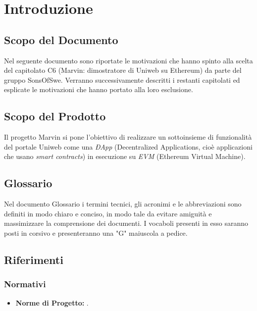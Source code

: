 \section{Introduzione}
\subsection{Scopo del Documento}
	Nel seguente documento sono riportate le motivazioni che hanno spinto alla scelta del capitolato C6 (Marvin: dimostratore di Uniweb su Ethereum) da parte del gruppo SonsOfSwe. Verranno successivamente descritti i restanti capitolati ed esplicate le motivazioni che hanno portato alla loro esclusione.
	
\subsection{Scopo del Prodotto}
	Il progetto Marvin si pone l'obiettivo di realizzare un sottoinsieme di funzionalità del portale Uniweb come una \textit{ÐApp} (Decentralized Applications, cioè applicazioni che usano \textit{smart contracts}) in esecuzione su \textit{EVM} (Ethereum Virtual Machine).
	
\subsection{Glossario}
	Nel documento Glossario i termini tecnici, gli acronimi e le abbreviazioni sono definiti in modo chiaro e conciso, in modo tale da evitare amiguità e massimizzare la comprensione dei documenti.
	\newline \newline I vocaboli presenti in esso saranno posti in corsivo e presenteranno una "G" maiuscola a pedice.
	
\subsection{Riferimenti}
	\subsubsection{Normativi}
		\begin{itemize}
			\item \textbf{Norme di Progetto: }.
		\end{itemize}
	
